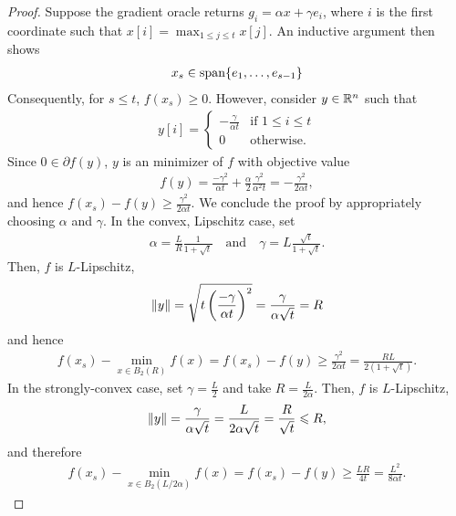 \begin{proof}
Suppose the gradient oracle returns $g_i = \alpha x + \gamma e_i$, where
$i$ is the first coordinate such that $x[i] = \max_{1 \leq j \leq t} x[j]$. 
An inductive argument then shows
\begin{align}
    x_s \in \mathop{\rm span}\{e_1, \dots, e_{s-1}\}
\end{align}
Consequently, for $s \leq t$, $f(x_s) \geq 0$. However, consider $y\in \mathbb{R}^n$
such that
\begin{align}
    y[i] = 
    \begin{cases}
        -\frac{\gamma}{\alpha t} &\text{if } 1 \leq i \leq t\\
        0 &\text{otherwise}.
    \end{cases}
\end{align}
Since $0 \in \partial f(y)$, $y$ is an minimizer of $f$ with objective value
\begin{align}
    f(y)
    = \frac{-\gamma^2}{\alpha t} + \frac{\alpha}{2}\frac{\gamma^2}{\alpha^2 t}
    = -\frac{\gamma^2}{2\alpha t},
\end{align}
and hence $f(x_s) - f(y) \geq \frac{\gamma^2}{2 \alpha t}$.
We conclude the proof by appropriately choosing $\alpha$ and $\gamma$. 
In the convex, Lipschitz case, set 
\begin{align}
    \alpha = \frac{L}{R} \frac{1}{1 + \sqrt{t}}
    \quad
    \text{and}
    \quad
    \gamma = L \frac{\sqrt{t}}{1 + \sqrt{t}}.
\end{align}
Then, $f$ is $L$-Lipschitz, 
\begin{align}
    \lVert y\rVert 
    = \sqrt{t \left(\frac{-\gamma}{\alpha t} \right )^2}
    = \frac{\gamma}{\alpha \sqrt{t}}
    = R
\end{align}
and hence
\begin{align}
    f(x_s) - \min_{x \in B_2(R)} f(x)
    = f(x_s) - f(y)
    \geq \frac{\gamma^2}{2\alpha t}
    = \frac{RL}{2(1+\sqrt{t})}.
\end{align}
In the strongly-convex case, set $\gamma = \frac{L}{2}$ and take
$R = \frac{L}{2\alpha}$. Then, $f$ is $L$-Lipschitz, 
\begin{align}
    \lVert y\rVert 
    = \frac{\gamma}{\alpha \sqrt{t}}
    = \frac{L}{2\alpha \sqrt{t}}
    = \frac{R}{\sqrt{t}}
    \leqslant R,
\end{align}
and therefore
\begin{align}
    f(x_s) - \min_{x \in B_2(L/2\alpha)} f(x)
    = f(x_s) - f(y)
    \geq \frac{LR}{4t} 
    = \frac{L^2}{8\alpha t}.
\end{align}
\end{proof}

